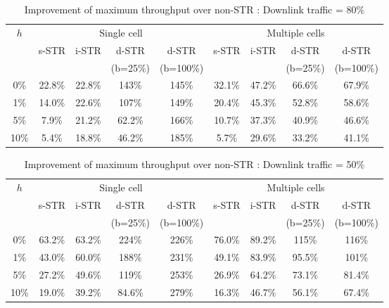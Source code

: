 \documentclass[twocolumn]{IEEEtran}
\begin{document}
\begin{center}
\begin{table*}[ht]
\centering \caption{Improvement of maximum throughput over non-STR :
Downlink traffic = 80\%}
\begin{small}
\begin{tabular}{c||c|c|c|c||c|c|c|c}
\hline
  \hline
\multirow{3}{*}{$h$}&\multicolumn{4}{c||}{Single cell}  &\multicolumn{4}{c}{Multiple cells}  \\
    \cline{2-9}
   & s-STR & i-STR & d-STR & d-STR & s-STR & i-STR & d-STR & d-STR  \\
  &   &    &(b=25\%)&(b=100\%)&  &  &(b=25\%)&(b=100\%)\\
  \hline
  \hline
  0\% & 22.8\% & 22.8\% & 143\%  & 145\% & 32.1\% & 47.2\% & 66.6\% & 67.9\% \\
  1\% & 14.0\% & 22.6\% & 107\%  & 149\% & 20.4\% & 45.3\% & 52.8\% & 58.6\%   \\
  5\% &  7.9\% & 21.2\% & 62.2\% & 166\% & 10.7\% & 37.3\% & 40.9\% & 46.6\%  \\
  10\% & 5.4\% & 18.8\% & 46.2\% & 185\% &  5.7\% & 29.6\% & 33.2\% & 41.1\% \\
\hline \hline
\end{tabular}
\end{small}
\end{table*}
\end{center}


\begin{center}
\begin{table*}[ht]
\centering \caption{Improvement of maximum throughput over non-STR :
Downlink traffic = 50\%}
\begin{small}
\begin{tabular}{c||c|c|c|c||c|c|c|c}
\hline
  \hline
\multirow{3}{*}{$h$} &\multicolumn{4}{c||}{Single cell}  &\multicolumn{4}{c}{Multiple cells}  \\
    \cline{2-9}
   & s-STR & i-STR & d-STR & d-STR & s-STR & i-STR & d-STR & d-STR  \\
  &   &    &(b=25\%)&(b=100\%)&  &  &(b=25\%)&(b=100\%)\\
  \hline
  \hline
  0\% & 63.2\% & 63.2\% &  224\% &   226\% & 76.0\% & 89.2\% & 115\%  & 116\%\\
  1\% & 43.0\% & 60.0\% &  188\% &   231\% & 49.1\% & 83.9\% & 95.5\% & 101\%\\
  5\% & 27.2\% & 49.6\% &  119\% &   253\% & 26.9\% & 64.2\% & 73.1\% & 81.4\%\\
  10\%& 19.0\% & 39.2\% &  84.6\%&   279\% & 16.3\% & 46.7\% & 56.1\% & 67.4\%\\
\hline \hline
\end{tabular}
\end{small}
\end{table*}
\end{center}
\end{document}
